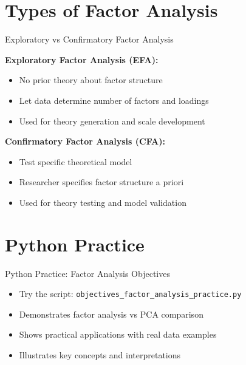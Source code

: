 \documentclass[aspectratio=169]{beamer}
\begin{document}
\section{Types of Factor Analysis}
\begin{frame}{Exploratory vs Confirmatory Factor Analysis}
  
  \textbf{Exploratory Factor Analysis (EFA):}
  \begin{itemize}
    \item No prior theory about factor structure
    \item Let data determine number of factors and loadings
    \item Used for theory generation and scale development
  \end{itemize}
  
  \vspace{0.5cm}
  
  \textbf{Confirmatory Factor Analysis (CFA):}
  \begin{itemize}
    \item Test specific theoretical model
    \item Researcher specifies factor structure a priori
    \item Used for theory testing and model validation
  \end{itemize}
\end{frame}

\section{Python Practice}
\begin{frame}{Python Practice: Factor Analysis Objectives}
  \begin{itemize}
    \item Try the script: \texttt{objectives\_factor\_analysis\_practice.py}
    \item Demonstrates factor analysis vs PCA comparison
    \item Shows practical applications with real data examples
    \item Illustrates key concepts and interpretations
  \end{itemize}
\end{frame}
\end{document}
